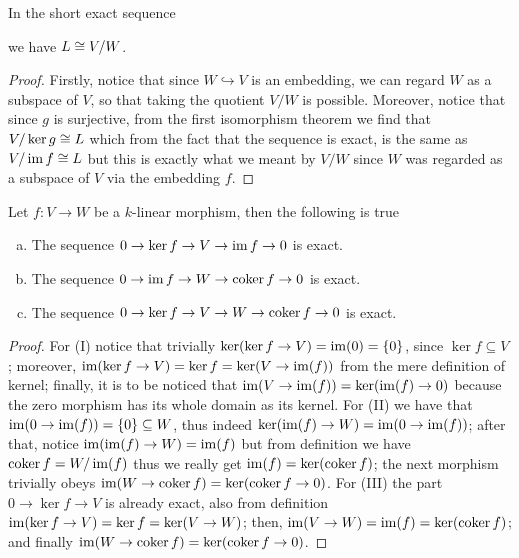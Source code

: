 \begin{proposition}
  In the short exact sequence 
  we have \(L \cong V/W\).
\end{proposition}

\begin{proof}
  Firstly, notice that since \(W \hookrightarrow V\) is an embedding, we can
  regard \(W\) as a subspace of \(V\), so that taking the quotient \(V/W\) is
  possible. Moreover, notice that since \(g\) is surjective, from the first
  isomorphism theorem we find that \(V/\ker g \cong L\) which from the fact that
  the sequence is exact, is the same as \(V/\operatorname{im} f \cong L\) but this is exactly
  what we meant by \(V/W\) since \(W\) was regarded as a subspace of \(V\) via
  the embedding \(f\).
\end{proof}

\begin{proposition}
   Let \(f : V \to W\) be a \(k\)-linear morphism, then the following is true
   \begin{enumerate}[(a).]
     \item The sequence \(0 \to \ker f \to V \to \operatorname{im} f \to 0\) is exact.
     \item The sequence \(0 \to \operatorname{im} f \to W \to \operatorname{coker} f \to 0\) is exact.
     \item The sequence \(0 \to \ker f \to V \to W \to \operatorname{coker} f \to 0\) is
       exact.
   \end{enumerate}
\end{proposition}

\begin{proof}
  For (I) notice that trivially \(\ker(\ker f \to V) = \operatorname{im}(0) = \{0\}\), since
  \(\ker f \subseteq V\); moreover, \(\operatorname{im}(\ker f \to V) = \ker f = \ker(V \to
  \operatorname{im}(f))\) from the mere definition of kernel; finally, it is to be noticed
  that \(\operatorname{im}(V \to \operatorname{im}(f)) = \ker(\operatorname{im}(f) \to 0)\) because the zero morphism has
  its whole domain as its kernel. 
  For (II) we have that \(\operatorname{im}(0 \to \operatorname{im}(f)) = \{0\} \subseteq W\), thus indeed
  \(\ker(\operatorname{im}(f) \to W) = \operatorname{im}(0 \to \operatorname{im}(f))\); after that, notice \(\operatorname{im}(\operatorname{im}(f)
  \to W) = \operatorname{im}(f)\) but from definition we have \(\operatorname{coker} f = W/\operatorname{im}(f)\) thus we
  really get \(\operatorname{im}(f) = \ker(\operatorname{coker} f)\); the next morphism trivially obeys
  \(\operatorname{im}(W \to \operatorname{coker} f) = \ker(\operatorname{coker} f \to 0)\).
  For (III) the part \(0 \to \ker f \to V\) is already exact, also from
  definition \(\operatorname{im}(\ker f \to V) = \ker f = \ker(V \to W)\); then, \(\operatorname{im}(V \to
  W) = \operatorname{im}(f) = \ker(\operatorname{coker} f)\); and finally  \(\operatorname{im}(W \to \operatorname{coker} f) =
  \ker(\operatorname{coker} f \to 0)\).
\end{proof}

